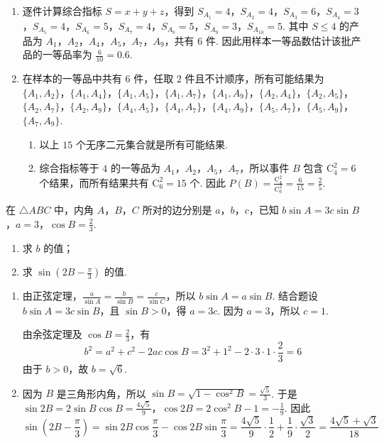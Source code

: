 \begin{solution}
\begin{enumerate}
\item 逐件计算综合指标 \(S=x+y+z\)，得到
\(S_{A_1}=4\)，\(S_{A_2}=4\)，\(S_{A_3}=6\)，\(S_{A_4}=3\)，\(S_{A_5}=4\)，\(S_{A_6}=5\)，\(S_{A_7}=4\)，\(S_{A_8}=5\)，\(S_{A_9}=3\)，\(S_{A_{10}}=5\).
其中 \(S\leqslant 4\) 的产品为 \(A_1\)，\(A_2\)，\(A_4\)，\(A_5\)，\(A_7\)，\(A_9\)，共有 \(6\) 件. 因此用样本一等品数估计该批产品的一等品率为
\(\frac{6}{10}=0.6\).

\item 在样本的一等品中共有 \(6\) 件，任取 \(2\) 件且不计顺序，所有可能结果为
\(\{A_1,A_2\}\)，\(\{A_1,A_4\}\)，\(\{A_1,A_5\}\)，\(\{A_1,A_7\}\)，\(\{A_1,A_9\}\)，\(\{A_2,A_4\}\)，\(\{A_2,A_5\}\)，\(\{A_2,A_7\}\)，\(\{A_2,A_9\}\)，\(\{A_4,A_5\}\)，\(\{A_4,A_7\}\)，\(\{A_4,A_9\}\)，\(\{A_5,A_7\}\)，\(\{A_5,A_9\}\)，\(\{A_7,A_9\}\).

 \begin{enumerate}
 \item 以上 \(15\) 个无序二元集合就是所有可能结果.

 \item 综合指标等于 \(4\) 的一等品为 \(A_1\)，\(A_2\)，\(A_5\)，\(A_7\)，所以事件 \(B\) 包含 \(\mathrm C_4^2=6\) 个结果，而所有结果共有 \(\mathrm C_6^2=15\) 个. 因此
 \(P(B)=\frac{\mathrm C_4^2}{\mathrm C_6^2}=\frac{6}{15}=\frac{2}{5}\).
 \end{enumerate}
\end{enumerate}
\end{solution}

\begin{problem}
在 \(\triangle ABC\) 中，内角 \(A\)，\(B\)，\(C\) 所对的边分别是 \(a\)，\(b\)，\(c\)，已知 \(b \sin A = 3c \sin B\)，\(a = 3\)，\(\cos B = \frac{2}{3}\).
\begin{enumerate}
\item 求 \(b\) 的值；
\item 求 \( \sin\left(2B-\frac{\pi}{3}\right) \) 的值.
\end{enumerate}
\end{problem}

\begin{solution}
\begin{enumerate}
\item 由正弦定理，\(\frac{a}{\sin A}=\frac{b}{\sin B}=\frac{c}{\sin C}\)，所以 \(b\sin A=a\sin B\). 结合题设 \(b\sin A=3c\sin B\)，且 \(\sin B>0\)，得 \(a=3c\). 因为 \(a=3\)，所以 \(c=1\).

由余弦定理及 \(\cos B=\frac{2}{3}\)，有
\[
b^2=a^2+c^2-2ac\cos B=3^2+1^2-2\cdot3\cdot1\cdot\frac{2}{3}=6
\]
由于 \(b>0\)，故 \(b=\sqrt{6}\).

\item 因为 \(B\) 是三角形内角，所以 \(\sin B=\sqrt{1-\cos^2B}=\frac{\sqrt{5}}{3}\). 于是
\(\sin 2B=2\sin B\cos B=\frac{4\sqrt{5}}{9}\)，\(\cos 2B=2\cos^2B-1=-\frac{1}{9}\). 因此
\[
\sin\left(2B-\frac{\pi}{3}\right)
=\sin 2B\cos\frac{\pi}{3}-\cos 2B\sin\frac{\pi}{3}
=\frac{4\sqrt{5}}{9}\cdot\frac{1}{2}+\frac{1}{9}\cdot\frac{\sqrt{3}}{2}
=\frac{4\sqrt{5}+\sqrt{3}}{18}
\]
\end{enumerate}
\end{solution}

